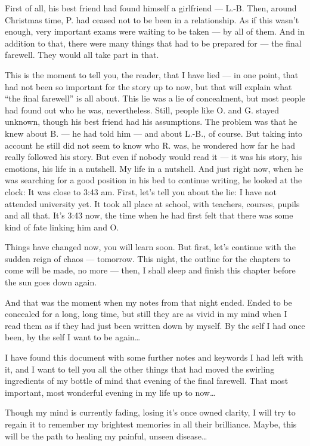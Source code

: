 First of all, his best friend had found himself a girlfriend --- L.-B. Then, around Christmas time, P. had ceased not to be been in a relationship. As if this wasn't enough, very important exams were waiting to be taken --- by all of them. And in addition to that, there were many things that had to be prepared for --- the final farewell. They would all take part in that.

This is the moment to tell you, the reader, that I have lied --- in one point, that had not been so important for the story up to now, but that will explain what \enquote{the final farewell} is all about. This lie was a lie of concealment, but most people had found out who he was, nevertheless. Still, people like O. and G. stayed unknown, though his best friend had his assumptions. The problem was that he knew about B. --- he had told him --- and about L.-B., of course. But taking into account he still did not seem to know who R. was, he wondered how far he had really followed his story. But even if nobody would read it --- it was his story, his emotions, his life in a nutshell. My life in a nutshell. And just right now, when he was searching for a good position in his bed to continue writing, he looked at the clock: It was close to 3:43 am. First, let's tell you about the lie: I have not attended university yet. It took all place at school, with teachers, courses, pupils and all that. It's 3:43 now, the time when he had first felt that there was some kind of fate linking him and O.

Things have changed now, you will learn soon. But first, let's continue with the sudden reign of chaos --- tomorrow. This night, the outline for the chapters to come will be made, no more --- then, I shall sleep and finish this chapter before the sun goes down again.

And that was the moment when my notes from that night ended. Ended to be concealed for a long, long time, but still they are as vivid in my mind when I read them as if they had just been written down by myself. By the self I had once been, by the self I want to be again\ldots

I have found this document with some further notes and keywords I had left with it, and I want to tell you all the other things that had moved the swirling ingredients of my bottle of mind that evening of the final farewell. That most important, most wonderful evening in my life up to now\ldots

Though my mind is currently fading, losing it's once owned clarity, I will try to regain it to remember my brightest memories in all their brilliance. Maybe, this will be the path to healing my painful, unseen disease\ldots

